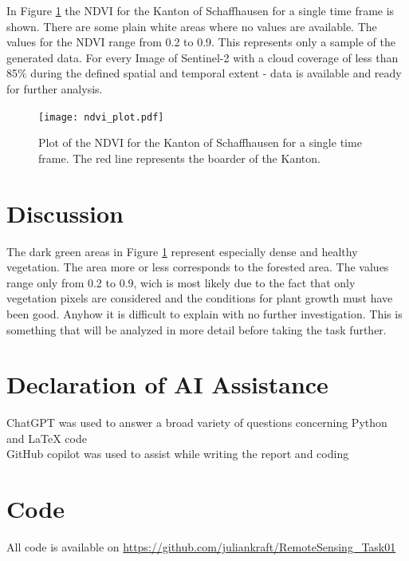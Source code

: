 \documentclass{article}
\begin{document}
In Figure \ref{fig:ndvi_plot} the NDVI for the Kanton of Schaffhausen for a single time frame is shown.
There are some plain white areas where no values are available. The values for the NDVI range from 0.2 to 0.9.
This represents only a sample of the generated data. For every Image of Sentinel-2 with a cloud coverage of less than 85\%
during the defined spatial and temporal extent - data is available and ready for further analysis.

\begin{figure}[h]
  \centering
  \texttt{[image: ndvi\_plot.pdf]}
  \caption{Plot of the NDVI for the Kanton of Schaffhausen for a single time frame. The red line represents the boarder of the Kanton.}
  \label{fig:ndvi_plot}
\end{figure}


\section*{Discussion}

The dark green areas in Figure \ref{fig:ndvi_plot} represent especially dense and healthy vegetation. The area more or less corresponds to the forested area.
The values range only from 0.2 to 0.9, wich is most likely due to the fact that only vegetation pixels are considered
and the conditions for plant growth must have been good. Anyhow it is difficult to explain with no further investigation.
This is something that will be analyzed in more detail before taking the task further.

 

\vfill

\printbibliography

\section*{Declaration of AI Assistance}
ChatGPT was used to answer a broad variety of questions concerning Python and LaTeX code\\
GitHub copilot was used to assist while writing the report and coding

\section*{Code}
All code is available on \url{https://github.com/juliankraft/RemoteSensing_Task01}
\end{document}
